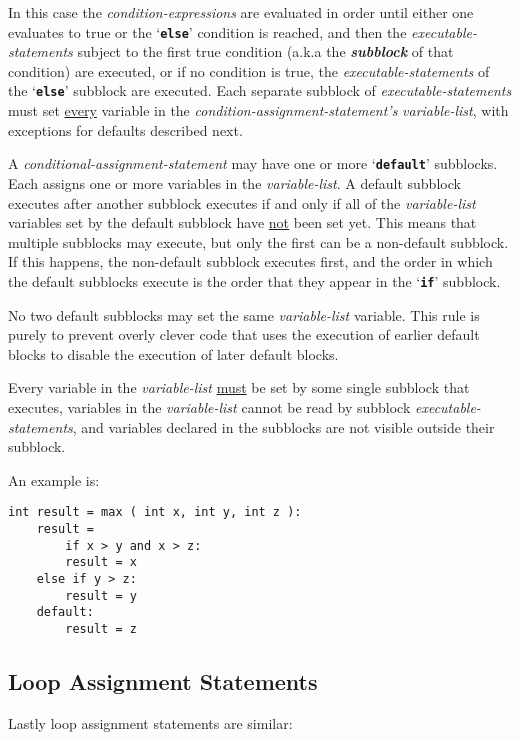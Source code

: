 \documentclass[12pt]{article}
\makeatletter
\newcommand{\TT}[1]{{\tt \bfseries #1}}
\newcommand{\key}[1]{{\bf \em #1}\index{#1}}
\newcommand{\ttkey}[1]{\TT{#1}\index{#1@{\tt #1}}}
\newenvironment{indpar}[1][0.3in]%
	{\begin{list}{}%
		     {\setlength{\itemsep}{0in}%
		      \setlength{\topsep}{0in}%
		      \setlength{\parsep}{1ex}%
		      \setlength{\labelwidth}{#1}%
		      \setlength{\leftmargin}{#1}%
		      \addtolength{\leftmargin}{\labelsep}}%
	 \item}%
	{\end{list}}
\makeatother
\begin{document}
In this case the {\em condition-expressions} are evaluated in order
until either one evaluates to true or the `\TT{else}' condition is
reached, and then the {\em executable-statements} subject to the
first true condition (a.k.a the \key{subblock} of that condition)
are executed, or if no condition is true, the {\em executable-statements}
of the `\TT{else}' subblock are executed.  Each separate subblock of
{\em executable-statements} must set \underline{every} variable
in the {\em condition-assignment-statement's} {\em variable-list},
with exceptions for defaults described next.

A {\em conditional-assignment-statement} may have one or
more `\ttkey{default}\TT{:}' subblocks.  Each assigns one or more
variables in the {\em variable-list}.  A default subblock
executes after another subblock executes if and only if all of the
{\em variable-list} variables set by the default subblock have
\underline{not} been set yet.  This means that multiple subblocks
may execute, but only the first can be a non-default subblock.
If this happens, the non-default subblock executes first, and
the order in which the default subblocks execute
is the order that they appear in the `\TT{if}' subblock.

No two default subblocks may set the same {\em variable-list}
variable.  This rule is purely to prevent overly clever code that
uses the execution of earlier default blocks to disable the
execution of later default blocks.

Every variable in the {\em variable-list} \underline{must} be set by some
single subblock that executes, variables in the
{\em variable-list} cannot be read by subblock {\em executable-statements},
and variables declared in the subblocks are not visible outside their
subblock.

An example is:
\begin{indpar}\begin{verbatim}
int result = max ( int x, int y, int z ):
    result =
        if x > y and x > z:
	    result = x
	else if y > z:
	    result = y
	default:
	    result = z
\end{verbatim}\end{indpar}

\subsection{Loop Assignment Statements}
\label{LOOP-ASSIGNMENT-STATEMENTS}

Lastly loop assignment statements are similar:
\end{document}
